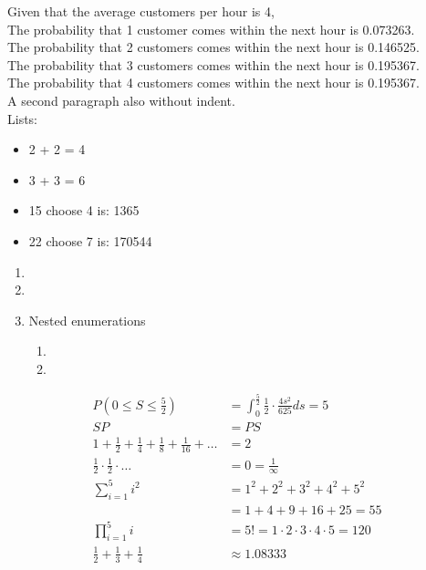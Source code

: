 \documentclass[11pt]{article}
\begin{document}
    
        \noindent
        Given that the average customers per hour is 4, \\
        The probability that 1 customer comes within the next hour is 0.073263. \\
        The probability that 2 customers comes within the next hour is 0.146525. \\
        The probability that 3 customers comes within the next hour is 0.195367. \\
        The probability that 4 customers comes within the next hour is 0.195367. \\
        
        \noindent
        A second paragraph also without indent. \\
    
    Lists:
    \begin{itemize}
        \item  2 + 2 = 4
        \item  3 + 3 = 6
        \item  15 choose 4 is: 1365

        \item  22 choose 7 is: 170544
    \end{itemize}
    
    \begin{enumerate}
        \item  \lipsum[1]
        \item  \lipsum[2]
        \item  Nested enumerations
        \begin{enumerate}%
            \item  \lipsum[3]
            \item  \lipsum[4]
        \end{enumerate}
    \end{enumerate}
    
    \begin{align*}
        P(0 \leq S \leq \frac{5}{2}) &= \int_{0}^{\frac{5}{2}} \frac{1}{2} \cdot \frac{{4s^2}}{625} ds = 5 \\
        SP &= PS \\
        1 + \frac{1}{2}+\frac{1}{4}+\frac{1}{8}+\frac{1}{16} + \hdots &= 2 \\
        \frac{1}{2} \cdot \frac{1}{2} \cdot \hdots &= 0 = \frac{1}{\infty} \\
        \sum_{i = 1}^{5} i^2 &= 1^2+2^2+3^2+4^2+5^2 \\
        &= 1+4+9+16+25 = 55 \\
        \prod_{i = 1}^{5} i &= 5! = 1 \cdot 2 \cdot 3 \cdot 4 \cdot 5 = 120 \\
        \frac{1}{2} + \frac{1}{3} + \frac{1}{4} &\approx 1.08333
    \end{align*}
    
\end{document}
